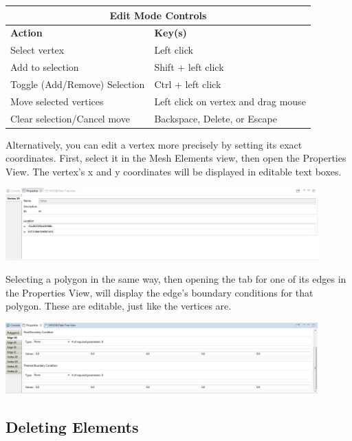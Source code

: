 \documentclass{article}
\begin{document}
\begin{center}
    \begin{tabular}{| l | l |}
    \hline
    \multicolumn{2}{|c|}{\textbf{Edit Mode Controls}} \\
  	\hline
    \textbf{Action} & \textbf{Key(s)} \\ \hline
    Select vertex & Left click \\ \hline
    Add to selection & Shift + left click \\ \hline
    Toggle (Add/Remove) Selection & Ctrl + left click \\ \hline
    Move selected vertices & Left click on vertex and drag mouse \\ \hline
    Clear selection/Cancel move & Backspace, Delete, or Escape \\ 
    \hline
    \end{tabular}
\end{center}

Alternatively, you can edit a vertex more precisely by setting its exact
coordinates. First, select it in the Mesh Elements view, then open the
Properties View. The vertex's x and y coordinates will be displayed in editable
text boxes.

\begin{center}
\includegraphics[width=12cm]{images/VertexPropertiesView}
\end{center}

Selecting a polygon in the same way, then opening the tab for one of its edges
in the Properties View, will display the edge's boundary conditions for that
polygon. These are editable, just like the vertices are.

\begin{center}
\includegraphics[width=12cm]{images/EdgeBoundaryConditions}
\end{center}

\subsection{Deleting Elements}
\end{document}
